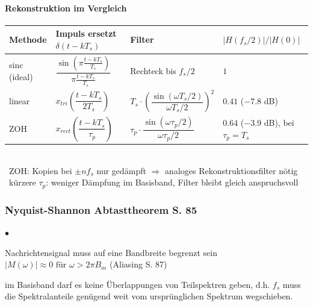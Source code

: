 \paragraph{Rekonstruktion im Vergleich}
{\renewcommand{\arraystretch}{1.7}
\begin{tabularx}{\linewidth}{l l l X}
	\textbf{Methode} & \textbf{Impuls ersetzt $\delta(t - kT_s)$} & \textbf{Filter} & \textbf{$|H(f_s/2)|/|H(0)|$} \\ \hline
	sinc (ideal) & $\dfrac{\sin\left(\pi \frac{t-kT_s}{T_s}\right)}{\pi \frac{t-kT_s}{T_s}}$ & Rechteck bis $f_s/2$ & $1$ \\
	linear & $x_{tri}\left(\dfrac{t-kT_s}{2T_s}\right)$ & $T_s \cdot \left(\dfrac{\sin(\omega T_s/2)}{\omega T_s/2}\right)^2$ & $0.41$ ($-7.8$ dB) \\
	ZOH & $x_{rect}\left(\dfrac{t-kT_s}{\tau_p}\right)$ & $\tau_p \cdot \dfrac{\sin(\omega \tau_p/2)}{\omega \tau_p/2}$ & $0.64$ ($-3.9$ dB), bei $\tau_p = T_s$ \\
\end{tabularx}}\\
{\small \textrightarrow\ ZOH: Kopien bei $\pm n f_s$ nur gedämpft $\Rightarrow$ analoges Rekonstruktionsfilter nötig}\\
{\small \textrightarrow\ kürzere $\tau_p$: weniger Dämpfung im Basisband, Filter bleibt gleich anspruchsvoll}

\subsubsection{Nyquist-Shannon Abtasttheorem S. 85}
	\begin{list}{$\bullet$}{\setlength{\itemsep}{0cm} \setlength{\parsep}{0cm}
	\setlength{\topsep}{0cm}} 
		\item Nachrichtensignal muss auf eine Bandbreite begrenzt sein $|M(\omega)|\approx 0 \text{ für } \omega > 2\pi B_m$ (Aliasing S. 87)
		\item im Basisband darf es keine Überlappungen von Teilspektren geben, d.h. $f_s$ muss die Spektralanteile genügend weit vom ursprünglichen Spektrum wegschieben.
	\end{list}

